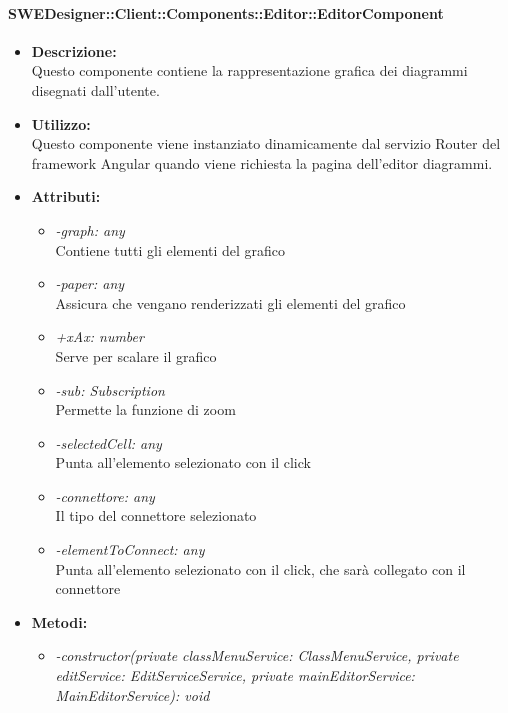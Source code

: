           	\paragraph{SWEDesigner::Client::Components::Editor::EditorComponent}
				\begin{itemize}
          			\item \textbf{Descrizione:}\\
          			Questo componente contiene la rappresentazione grafica dei diagrammi disegnati dall’utente.
          			\item \textbf{Utilizzo:}\\
          			Questo componente viene instanziato dinamicamente dal servizio Router del framework Angular quando viene richiesta la pagina dell’editor diagrammi.
          			\item \textbf{Attributi:}\\
          			\begin{itemize}
          				\item \emph{-graph: any}\\
            			Contiene tutti gli elementi del grafico
            			\item \emph{-paper: any}\\
            			Assicura che vengano renderizzati gli elementi del grafico
            			\item \emph{+xAx: number}\\
            			Serve per scalare il grafico
            			\item \emph{-sub: Subscription}\\
            			Permette la funzione di zoom
            			\item \emph{-selectedCell: any}\\
            			Punta all'elemento selezionato con il click
            			\item \emph{-connettore: any}\\
            			Il tipo del connettore selezionato
            			\item \emph{-elementToConnect: any}\\
            			Punta all'elemento selezionato con il click, che sarà collegato con il connettore
          			\end{itemize}
          			\item \textbf{Metodi:}\\
          			\begin{itemize}
          				\item \emph{-constructor(private classMenuService: ClassMenuService, private editService: EditServiceService, private mainEditorService: MainEditorService): void}\\

\end{itemize}
\end{itemize}
